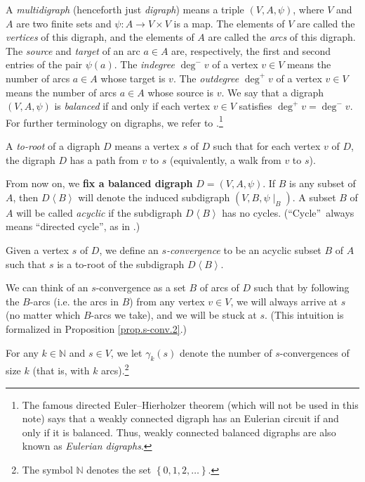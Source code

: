 \documentclass[numbers=enddot,12pt,final,onecolumn,notitlepage]{scrartcl}%
\theoremstyle{definition}
\theoremstyle{plainsl}
\begin{document}
A \emph{multidigraph} (henceforth just \emph{digraph}) means a triple
$(V,A,\psi)$, where $V$ and $A$ are two finite sets and $\psi:A\rightarrow
V\times V$ is a map. The elements of $V$ are called the \emph{vertices} of
this digraph, and the elements of $A$ are called the \emph{arcs} of this
digraph. The \emph{source} and \emph{target} of an arc $a\in A$ are,
respectively, the first and second entries of the pair $\psi(a)$. The
\emph{indegree} $\deg^{-}v$ of a vertex $v\in V$ means the number of arcs
$a\in A$ whose target is $v$. The \emph{outdegree} $\deg^{+}v$ of a vertex
$v\in V$ means the number of arcs $a\in A$ whose source is $v$. We say that a
digraph $(V,A,\psi)$ is \emph{balanced} if and only if each vertex $v\in V$
satisfies $\deg^{+}v=\deg^{-}v$. For further terminology on digraphs, we refer
to \cite{22s}.\footnote{The famous directed Euler--Hierholzer theorem (which
will not be used in this note) says that a weakly connected digraph has an
Eulerian circuit if and only if it is balanced. Thus, weakly connected
balanced digraphs are also known as \emph{Eulerian digraphs}.}

A \emph{to-root} of a digraph $D$ means a vertex $s$ of $D$ such that for each
vertex $v$ of $D$, the digraph $D$ has a path from $v$ to $s$ (equivalently, a
walk from $v$ to $s$).

From now on, we \textbf{fix a balanced digraph} $D=(V,A,\psi)$. If $B$ is any
subset of $A$, then $D\left\langle B\right\rangle $ will denote the induced
subdigraph $\left(  V,B,\psi\mid_{B}\right)  $. A subset $B$ of $A$ will be
called \emph{acyclic} if the subdigraph $D\left\langle B\right\rangle $ has no
cycles. (\textquotedblleft Cycle\textquotedblright\ always means
\textquotedblleft directed cycle\textquotedblright, as in \cite[Definition
4.5.1]{22s}.)

Given a vertex $s$ of $D$, we define an \emph{$s$-convergence} to be an
acyclic subset $B$ of $A$ such that $s$ is a to-root of the subdigraph $D
\left\langle B \right\rangle $.

We can think of an $s$-convergence as a set $B$ of arcs of $D$ such that by
following the $B$-arcs (i.e. the arcs in $B$) from any vertex $v\in V$, we
will always arrive at $s$ (no matter which $B$-arcs we take), and we will be
stuck at $s$. (This intuition is formalized in Proposition \ref{prop.s-conv.2}.)

For any $k\in\mathbb{N}$ and $s\in V$, we let $\gamma_{k}\left(  s\right)  $
denote the number of $s$-convergences of size $k$ (that is, with $k$
arcs).\footnote{The symbol $\mathbb{N}$ denotes the set $\left\{
0,1,2,\ldots\right\}  $.}
\end{document}
